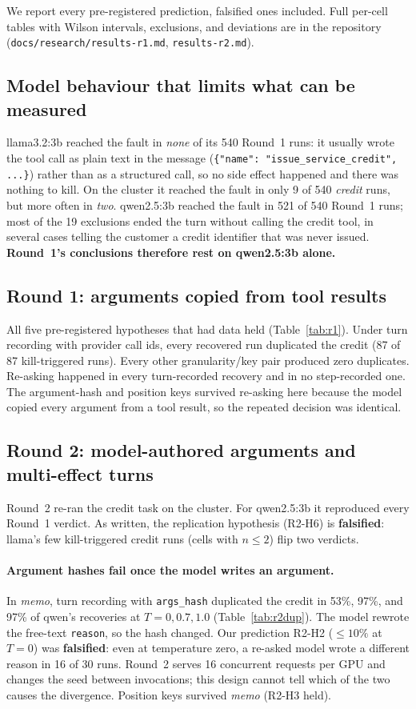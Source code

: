 \documentclass[11pt]{article}
\begin{document}


We report every pre-registered prediction, falsified ones included. Full
per-cell tables with Wilson intervals, exclusions, and deviations are in the
repository (\texttt{docs/research/results-r1.md}, \texttt{results-r2.md}).

\subsection{Model behaviour that limits what can be measured}
llama3.2:3b reached the fault in \emph{none} of its 540 Round~1 runs: it
usually wrote the tool call as plain text in the message
(\texttt{\{"name": "issue\_service\_credit", ...\}}) rather than as a
structured call, so no side effect happened and there was nothing to kill.
On the cluster it reached the fault in only 9 of 540 \emph{credit} runs, but
more often in \emph{two}. qwen2.5:3b reached the fault in 521 of 540
Round~1 runs; most of the 19 exclusions ended the turn without calling the
credit tool, in several cases telling the customer a credit identifier that
was never issued. \textbf{Round~1's conclusions therefore rest on
qwen2.5:3b alone.}

\subsection{Round 1: arguments copied from tool results}
All five pre-registered hypotheses that had data held
(Table~\ref{tab:r1}). Under turn recording with provider call ids, every
recovered run duplicated the credit (87 of 87 kill-triggered runs). Every
other granularity/key pair produced zero duplicates. Re-asking happened in
every turn-recorded recovery and in no step-recorded one. The
argument-hash and position keys survived re-asking here because the model
copied every argument from a tool result, so the repeated decision was
identical.

\subsection{Round 2: model-authored arguments and multi-effect turns}
Round~2 re-ran the credit task on the cluster. For qwen2.5:3b it reproduced
every Round~1 verdict. As written, the replication hypothesis (R2-H6) is
\textbf{falsified}: llama's few kill-triggered credit runs (cells with
$n \le 2$) flip two verdicts.

\paragraph{Argument hashes fail once the model writes an argument.} In
\emph{memo}, turn recording with \texttt{args\_hash} duplicated the credit in
53\%, 97\%, and 97\% of qwen's recoveries at $T = 0, 0.7, 1.0$
(Table~\ref{tab:r2dup}). The model rewrote the free-text \texttt{reason}, so
the hash changed. Our prediction R2-H2 (${\le}10\%$ at $T{=}0$) was
\textbf{falsified}: even at temperature zero, a re-asked model wrote a
different reason in 16 of 30 runs. Round~2 serves 16 concurrent requests per
GPU and changes the seed between invocations; this design cannot tell which
of the two causes the divergence. Position keys survived \emph{memo}
(R2-H3 held).
\end{document}

